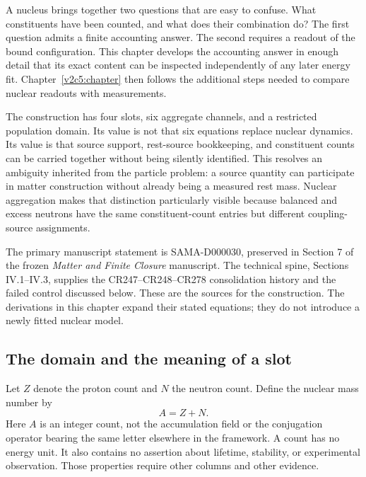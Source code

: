 \label{v2c4:chapter}

A nucleus brings together two questions that are easy to confuse. What constituents have been counted, and what does their combination do? The first question admits a finite accounting answer. The second requires a readout of the bound configuration. This chapter develops the accounting answer in enough detail that its exact content can be inspected independently of any later energy fit. Chapter~\ref{v2c5:chapter} then follows the additional steps needed to compare nuclear readouts with measurements.

The construction has four slots, six aggregate channels, and a restricted population domain. Its value is not that six equations replace nuclear dynamics. Its value is that source support, rest-source bookkeeping, and constituent counts can be carried together without being silently identified. This resolves an ambiguity inherited from the particle problem: a source quantity can participate in matter construction without already being a measured rest mass. Nuclear aggregation makes that distinction particularly visible because balanced and excess neutrons have the same constituent-count entries but different coupling-source assignments.

The primary manuscript statement is SAMA-D000030, preserved in Section 7 of the frozen \textit{Matter and Finite Closure} manuscript. The technical spine, Sections IV.1--IV.3, supplies the CR247--CR248--CR278 consolidation history and the failed control discussed below. These are the sources for the construction. The derivations in this chapter expand their stated equations; they do not introduce a newly fitted nuclear model.\cite{viisama,viispine,viireview}

\subsection{The domain and the meaning of a slot}
\label{v2c4:domain}

Let $Z$ denote the proton count and $N$ the neutron count. Define the nuclear mass number by
\begin{equation}
 A=Z+N.
 \label{v2c4:massnumber}
\end{equation}
Here $A$ is an integer count, not the accumulation field or the conjugation operator bearing the same letter elsewhere in the framework. A count has no energy unit. It also contains no assertion about lifetime, stability, or experimental observation. Those properties require other columns and other evidence.

